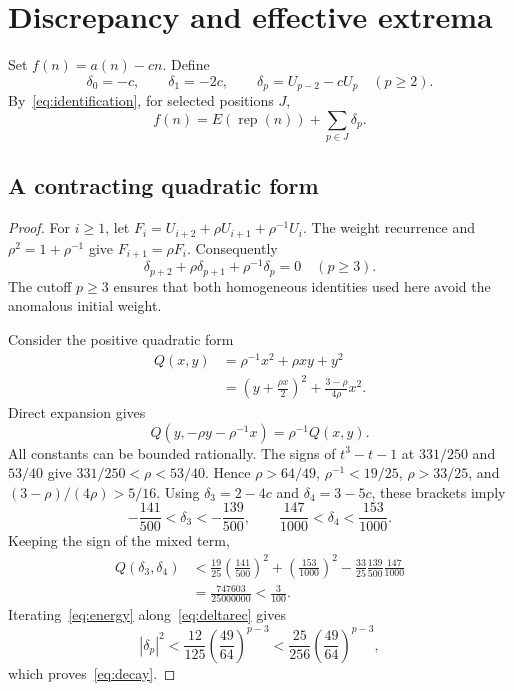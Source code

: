 \documentclass[11pt,a4paper]{article}
\numberwithin{equation}{section}
\newtheorem{lemma}[theorem]{Lemma}
\theoremstyle{remark}
\newcommand{\rep}{\operatorname{rep}}
\begin{document}
\section{Discrepancy and effective extrema}\label{sec:discrepancy}
Set $f(n)=a(n)-cn$. Define
\[
 \delta_0=-c,\qquad \delta_1=-2c,\qquad
 \delta_p=U_{p-2}-cU_p\quad(p\ge2).
\]
By~\eqref{eq:identification}, for selected positions $J$,
\begin{equation}\label{eq:discrepancy}
 f(n)=E(\rep(n))+\sum_{p\in J}\delta_p.
\end{equation}

\subsection{A contracting quadratic form}
\begin{proof}
For $i\ge1$, let
$F_i=U_{i+2}+\rho U_{i+1}+\rho^{-1}U_i$.
The weight recurrence and $\rho^2=1+\rho^{-1}$ give $F_{i+1}=\rho F_i$.
Consequently
\begin{equation}\label{eq:deltarec}
 \delta_{p+2}+\rho\delta_{p+1}+\rho^{-1}\delta_p=0\quad(p\ge3).
\end{equation}
The cutoff $p\ge3$ ensures that both homogeneous identities used here
avoid the anomalous initial weight.

Consider the positive quadratic form
\begin{align*}
 Q(x,y)&=\rho^{-1}x^2+\rho xy+y^2\\
 &=\left(y+\frac{\rho x}{2}\right)^2+
       \frac{3-\rho}{4\rho}x^2.
\end{align*}
Direct expansion gives
\begin{equation}\label{eq:energy}
 Q(y,-\rho y-\rho^{-1}x)=\rho^{-1}Q(x,y).
\end{equation}
All constants can be bounded rationally. The signs of $t^3-t-1$ at
$331/250$ and $53/40$ give
$331/250<\rho<53/40$. Hence $\rho>64/49$, $\rho^{-1}<19/25$,
$\rho>33/25$, and $(3-\rho)/(4\rho)>5/16$.
Using $\delta_3=2-4c$ and $\delta_4=3-5c$, these brackets imply
\[
 -\frac{141}{500}<\delta_3<-\frac{139}{500},\qquad
 \frac{147}{1000}<\delta_4<\frac{153}{1000}.
\]
Keeping the sign of the mixed term,
\begin{align*}
 Q(\delta_3,\delta_4)
 &<\frac{19}{25}\left(\frac{141}{500}\right)^2
   +\left(\frac{153}{1000}\right)^2
   -\frac{33}{25}\frac{139}{500}\frac{147}{1000}\\
 &=\frac{747603}{25000000}<\frac3{100}.
\end{align*}
Iterating~\eqref{eq:energy} along~\eqref{eq:deltarec} gives
\[
 |\delta_p|^2<\frac{12}{125}
       \left(\frac{49}{64}\right)^{p-3}
 <\frac{25}{256}\left(\frac{49}{64}\right)^{p-3},
\]
which proves~\eqref{eq:decay}.
\end{proof}
\end{document}
